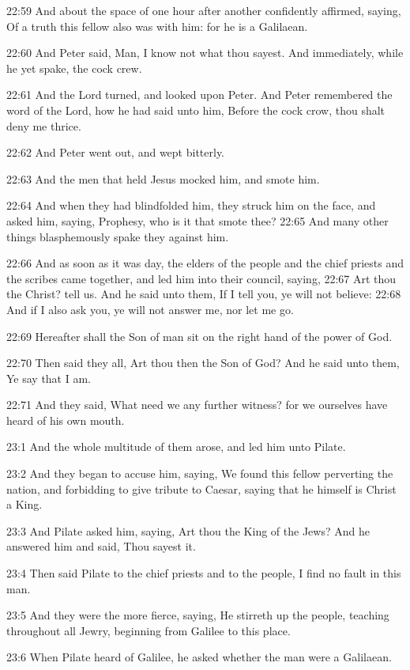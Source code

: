 22:59 And about the space of one hour after another confidently affirmed, saying, Of a truth this fellow also was with him: for he is a Galilaean.

22:60 And Peter said, Man, I know not what thou sayest. And immediately, while he yet spake, the cock crew.

22:61 And the Lord turned, and looked upon Peter. And Peter remembered the word of the Lord, how he had said unto him, Before the cock crow, thou shalt deny me thrice.

22:62 And Peter went out, and wept bitterly.

22:63 And the men that held Jesus mocked him, and smote him.

22:64 And when they had blindfolded him, they struck him on the face, and asked him, saying, Prophesy, who is it that smote thee?  22:65 And many other things blasphemously spake they against him.

22:66 And as soon as it was day, the elders of the people and the chief priests and the scribes came together, and led him into their council, saying, 22:67 Art thou the Christ? tell us. And he said unto them, If I tell you, ye will not believe: 22:68 And if I also ask you, ye will not answer me, nor let me go.

22:69 Hereafter shall the Son of man sit on the right hand of the power of God.

22:70 Then said they all, Art thou then the Son of God? And he said unto them, Ye say that I am.

22:71 And they said, What need we any further witness? for we ourselves have heard of his own mouth.

23:1 And the whole multitude of them arose, and led him unto Pilate.

23:2 And they began to accuse him, saying, We found this fellow perverting the nation, and forbidding to give tribute to Caesar, saying that he himself is Christ a King.

23:3 And Pilate asked him, saying, Art thou the King of the Jews? And he answered him and said, Thou sayest it.

23:4 Then said Pilate to the chief priests and to the people, I find no fault in this man.

23:5 And they were the more fierce, saying, He stirreth up the people, teaching throughout all Jewry, beginning from Galilee to this place.

23:6 When Pilate heard of Galilee, he asked whether the man were a Galilaean.

